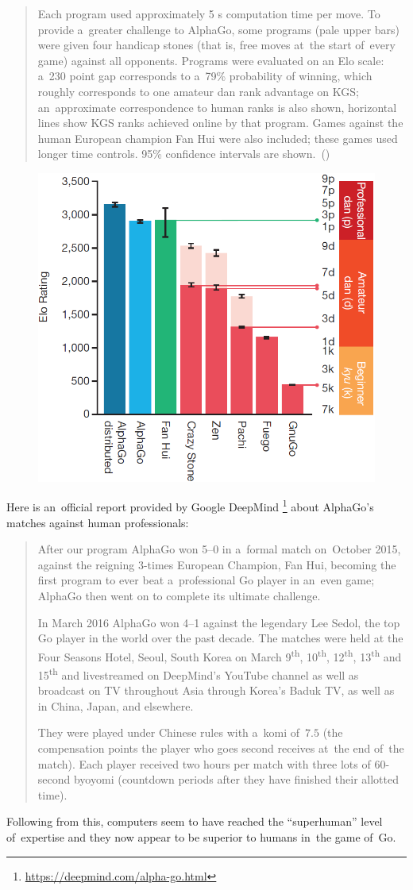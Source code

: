 \begin{quotation}
  Each program used approximately 5 s computation time per move.
  To provide a~greater challenge to AlphaGo, some programs (pale upper bars) were given four handicap stones (that is, free moves at~the start of~every game) against all opponents.
  Programs were evaluated on an Elo scale: a~230 point gap corresponds to a~79\% probability of winning, which roughly corresponds to one amateur dan rank advantage on KGS;
  an~approximate correspondence to human ranks is also shown, horizontal lines show KGS ranks achieved online by that program.
  Games against the human European champion Fan Hui were also included;
  these games used longer time controls.
  95\% confidence intervals are shown.~(\cite{Silver2016mastering})
\end{quotation}

\begin{figure}[H]
  \centering
  \includegraphics[width=.5\textwidth]{../img/results_of_tournament.png}
  \label{fig:Go-tournament}
\end{figure}

Here is an~official report provided by Google DeepMind%
\footnote{\href{https://deepmind.com/alpha-go.html}{https://deepmind.com/alpha-go.html}}
about AlphaGo's matches against human professionals:
\begin{quotation}
  After our program AlphaGo won 5--0 in a~formal match on~October 2015, against the reigning 3-times European Champion, Fan Hui, becoming the first program to ever beat a~professional Go player in an~even game;
  AlphaGo then went on to complete its ultimate challenge.

  In March 2016 AlphaGo won 4--1 against the legendary Lee Sedol, the top Go player in the world over the past decade.
  The matches were held at the Four Seasons Hotel, Seoul, South Korea on March 9\textsuperscript{th}, 10\textsuperscript{th}, 12\textsuperscript{th}, 13\textsuperscript{th} and 15\textsuperscript{th} and livestreamed on DeepMind’s YouTube channel as well as broadcast on TV throughout Asia through Korea’s Baduk TV, as well as in China, Japan, and elsewhere.

  They were played under Chinese rules with a~komi of~$7.5$ (the compensation points the player who goes second receives at~the end of~the match).
  Each player received two hours per match with three lots of 60-second byoyomi (countdown periods after they have finished their allotted time).
\end{quotation}

Following from this, computers seem to have reached the ``superhuman'' level of~expertise and they now appear to be superior to humans in~the game of~Go.
